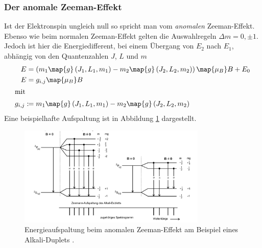 \subsubsection{Der anomale Zeeman-Effekt}
Ist der Elektronspin ungleich null so spricht man vom \emph{anomalen} Zeeman-Effekt.
Ebenso wie beim normalen Zeeman-Effekt gelten die Auswahlregeln $\Delta m=0, \pm 1$.
Jedoch ist hier die Energiedifferent, bei einem Übergang von $E_2$ nach $E_1$,
abhängig von den Quantenzahlen $J$, $L$ und $m$
\begin{align}
  E&=\left(m_1\map{g}\left(J_1,L_1,m_1\right)-m_2\map{g}\left(J_2,L_2,m_2\right)\right)\map{\mu_B}B+E_0 \notag \\
  E&=g_{i,j}\map{\mu_B}B \label{eq:energie_anomale_zemman}\\
\shortintertext{mit}
g_{i,j}:\!\!&=m_1\map{g}\left(J_1,L_1,m_1\right)-m_2\map{g}\left(J_2,L_2,m_2\right)\label{eq: faktor_gij}
\end{align}
Eine beispielhafte Aufspaltung ist in Abbildung \ref{fig: energie_aufspaltung_annomaler} dargestellt.
\FloatBarrier
\begin{figure}[h]
  \centering
  \includegraphics[width=0.8\textwidth]{pics/energieaufspaltung_annomaler.png}
  \caption{Energieaufspaltung beim anomalen Zeeman-Effekt am Beispiel eines Alkali-Duplets \cite{anleitung27}.}
  \label{fig: energie_aufspaltung_annomaler}
\end{figure}
\FloatBarrier
